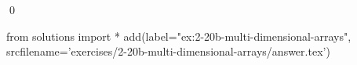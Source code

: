 
\begin{ex} 
  \label{ex:2-20b-multi-dimensional-arrays}
  
  \qed
\end{ex} 
\begin{python0}
from solutions import *
add(label="ex:2-20b-multi-dimensional-arrays",
    srcfilename='exercises/2-20b-multi-dimensional-arrays/answer.tex') 
\end{python0}
